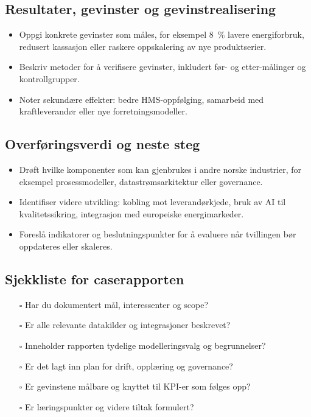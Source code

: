 \subsection{Resultater, gevinster og gevinstrealisering}
\begin{itemize}
    \item Oppgi konkrete gevinster som måles, for eksempel 8~\% lavere energiforbruk, redusert kassasjon eller raskere oppskalering av nye produktserier.
    \item Beskriv metoder for å verifisere gevinster, inkludert før- og etter-målinger og kontrollgrupper.
    \item Noter sekundære effekter: bedre HMS-oppfølging, samarbeid med kraftleverandør eller nye forretningsmodeller.
\end{itemize}

\subsection{Overføringsverdi og neste steg}
\begin{itemize}
    \item Drøft hvilke komponenter som kan gjenbrukes i andre norske industrier, for eksempel prosessmodeller, datastrømsarkitektur eller governance.
    \item Identifiser videre utvikling: kobling mot leverandørkjede, bruk av AI til kvalitetssikring, integrasjon med europeiske energimarkeder.
    \item Foreslå indikatorer og beslutningspunkter for å evaluere når tvillingen bør oppdateres eller skaleres.
\end{itemize}

\subsection*{Sjekkliste for caserapporten}
\begin{itemize}
    \item[$\square$] Har du dokumentert mål, interessenter og scope?
    \item[$\square$] Er alle relevante datakilder og integrasjoner beskrevet?
    \item[$\square$] Inneholder rapporten tydelige modelleringsvalg og begrunnelser?
    \item[$\square$] Er det lagt inn plan for drift, opplæring og governance?
    \item[$\square$] Er gevinstene målbare og knyttet til KPI-er som følges opp?
    \item[$\square$] Er læringspunkter og videre tiltak formulert?
\end{itemize}

